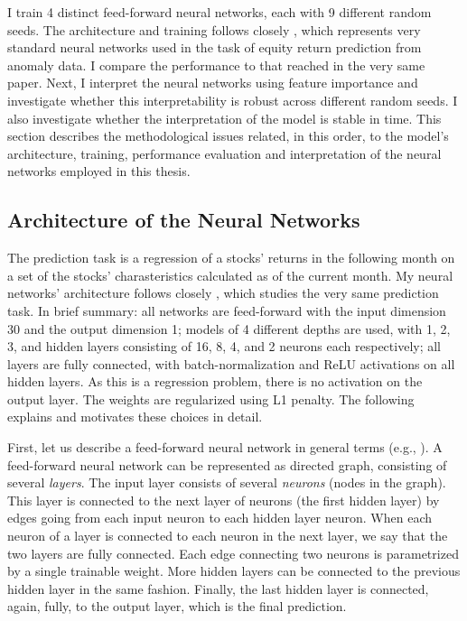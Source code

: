 	I train 4 distinct feed-forward neural networks, each with 9 different random seeds. The architecture and training follows closely \cite{gu2020empirical}, which represents very standard neural networks used in the task of equity return prediction from anomaly data. I compare the performance to that reached in the very same paper. Next, I interpret the neural networks using feature importance and investigate whether this interpretability is robust across different random seeds. I also investigate whether the interpretation of the model is stable in time. This  section describes the methodological issues related, in this order, to the model's architecture, training, performance evaluation and interpretation of the neural networks employed in this thesis.
	
	\subsection{Architecture of the Neural Networks}
	
		The prediction task is a regression of a stocks' returns in the following month on a set of the stocks' charasteristics calculated as of the current month. My neural networks' architecture follows closely \cite{gu2020empirical}, which studies the very same prediction task. In brief summary: all networks are feed-forward with the input dimension 30 and the output dimension 1; models of 4 different depths are used, with 1, 2, 3, and hidden layers consisting of 16, 8, 4, and 2 neurons each respectively; all layers are fully connected, with batch-normalization \citep{ioffe2015batch} and ReLU activations on all hidden layers. As this is a regression problem, there is no activation on the output layer. The weights are regularized using L1 penalty. The following explains and motivates these choices in detail.
		
		First, let us describe a feed-forward neural network in general terms (e.g., \cite{goodfellow2016deep}). A feed-forward neural network can be represented as directed graph, consisting of several \textit{layers}. The input layer consists of several \textit{neurons} (nodes in the graph). This layer is connected to the next layer of neurons (the first hidden layer) by edges going from each input neuron to each hidden layer neuron. When each neuron of a layer is connected to each neuron in the next layer, we say that the two layers are fully connected. Each edge connecting two neurons is parametrized by a single trainable weight. More hidden layers can be connected to the previous hidden layer in the same fashion. Finally, the last hidden layer is connected, again, fully, to the output layer, which is the final prediction.
		
